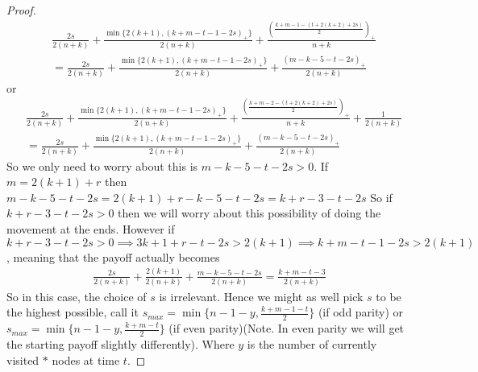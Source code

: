 \documentclass[a4paper,10pt]{article}
\newcommand{\pospart}[1]{\left( #1 \right)_{+}}
\theoremstyle{definition}
\theoremstyle{definition}
\theoremstyle{remark}
\theoremstyle{definition}
\begin{document}
\begin{proof}
\begin{align*}
&\frac{2s}{2(n+k)}+\frac{\min \{ 2(k+1), \pospart{k+m-t-1-2s} \}}{2(n+k)} +\frac{\pospart{\frac{k+m-1-(t+2(k+2)+2s)}{2}}}{n+k} \\
&=\frac{2s}{2(n+k)}+\frac{\min \{ 2(k+1), \pospart{k+m-t-1-2s} \}}{2(n+k)} +\frac{\pospart{m-k-5-t-2s}}{2(n+k)} 
\end{align*}
or
\begin{align*}
&\frac{2s}{2(n+k)}+\frac{\min \{ 2(k+1), \pospart{k+m-t-1-2s} \}}{2(n+k)} +\frac{\pospart{\frac{k+m-2-(t+2(k+2)+2s)}{2}}}{n+k}+\frac{1}{2(n+k)} \\
&=\frac{2s}{2(n+k)}+\frac{\min \{ 2(k+1), \pospart{k+m-t-1-2s} \}}{2(n+k)} +\frac{\pospart{m-k-5-t-2s}}{2(n+k)} 
\end{align*}
So we only need to worry about this is $m-k-5-t-2s >0$.
If $m=2(k+1)+r$ then $m-k-5-t-2s=2(k+1)+r-k-5-t-2s=k+r-3-t-2s$
So if $k+r-3-t-2s> 0$ then we will worry about this possibility of doing the movement at the ends.
However if $k+r-3-t-2s >0 \implies 3k+1+r-t-2s>2(k+1) \implies k+m-t-1-2s>2(k+1)$, meaning that the payoff actually becomes
\begin{align*}
\frac{2s}{2(n+k)}+\frac{2(k+1)}{2(n+k)} +\frac{m-k-5-t-2s}{2(n+k)}
=\frac{k+m-t-3}{2(n+k)}
\end{align*}
So in this case, the choice of $s$ is irrelevant.
Hence we might as well pick $s$ to be the highest possible, call it $s_{max}=\min \{ n-1-y,\frac{k+m-1-t}{2} \}$ (if odd parity) or $s_{max}=\min \{ n-1-y, \frac{k+m-t}{2} \}$ (if even parity)(Note. In even parity we will get the starting payoff slightly differently).
Where $y$ is the number of currently visited $*$ nodes at time $t$.


\end{proof}
\end{document}
